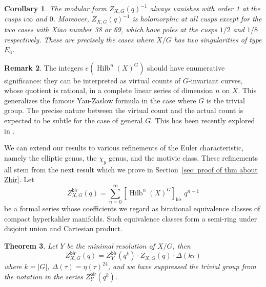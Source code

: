 \documentclass{amsart}
\newtheorem{theorem}{Theorem}[section]
\newtheorem{corollary}[theorem]{Corollary}
\theoremstyle{definition}
\newtheorem{remark}[theorem]{Remark}
\newcommand{\bir}{\mathsf{bir}}
\newcommand{\Hilb}{\operatorname{Hilb}}
\begin{document}
\begin{corollary}\label{cor: vanishing at cusps}
The modular form $Z_{X,G}(q)^{-1}$ always vanishes with order 1 at the cusps
$i\infty$ and $0$. Moreover,
$Z_{X,G}(q)^{-1}$ is holomorphic at all cusps except for the two cases with
Xiao number 38 or 69, which have poles at the cusps $1/2$ and $1/8$
respectively. These are precisely the cases where $X/G$ has two
singularities of type $E_{6}$.
\end{corollary}

\begin{remark}\label{rem: enumerative interpretation}
The integers $e\left(\Hilb^{n}(X)^{G} \right)$ should have enumerative
significance: they can be interpreted as virtual counts of
$G$-invariant curves, whose quotient is rational, in a complete linear
series of dimension $n$ on $X$. This generalizes the famous Yau-Zaslow
formula in the case where $G$ is the trivial group. The precise nature
between the virtual count and the actual count is expected to be
subtle for the case of general $G$. This has been recently explored in
\cite{Zhan-2019-counting-curves-on-K3}.
\end{remark}


We can extend our results to various refinements of the Euler
characteristic, namely the elliptic genus, the $\chi_{y}$ genus, and
the motivic class. These refinements all stem from the next
result which we prove in Section~\ref{sec: proof of thm about Zbir}. Let 
\[
Z^{\bir}_{X,G}(q) = \sum_{n=0}^{\infty} [\Hilb^{n}(X)^{G}]_{\bir} \,
\, q^{n-1}
\]
be a formal series whose coefficients we regard as birational
equivalence classes of compact hyperkahler manifolds. Such equivalence
classes form a semi-ring under disjoint union and Cartesian
product.

\begin{theorem}\label{thm: Formula for Zbir}
Let $Y$ be the minimal resolution of $X/G$, then
\[
Z^{\bir}_{X,G} (q) = Z^{\bir}_{Y}(q^{k})\cdot Z_{X,G}(q)\cdot \Delta (k\tau )
\]
where $k=|G|$, $\Delta (\tau ) = \eta (\tau )^{24}$, and we have
suppressed the trivial group from the notation in the series
$Z^{\bir}_{Y}(q^{k})$.
\end{theorem}
\end{document}
